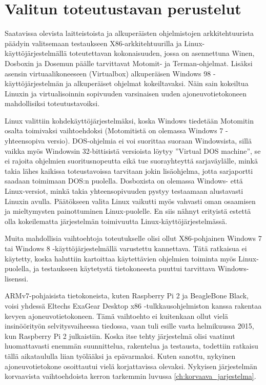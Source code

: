 \section{Valitun toteutustavan perustelut}
Saatavissa olevista laitteistoista ja alkuperäisten ohjelmistojen arkkitehtuurista päädyin valitsemaan testaukseen X86-arkkitehtuurilla ja Linux-käyttöjärjestelmällä toteutettavan kokonaisuuden, jossa on asennettuna Winen, Dosboxin ja Dosemun päälle tarvittavat Motomit- ja Terman-ohjelmat. Lisäksi asensin virtuaalikoneeseen (Virtualbox) alkuperäisen Windows 98 -käyttöjärjestelmän ja alkuperäiset ohjelmat kokeiltavaksi. Näin sain kokeiltua Linuxin ja virtualisoinnin sopivuuden varsinaisen uuden ajoneuvotietokoneen mahdollisiksi toteutustavoiksi.

Linux valittiin kohdekäyttöjärjestelmäksi, koska Windows tiedetään Motomitin osalta toimivaksi vaihtoehdoksi (Motomitistä on olemassa Windows 7 -yhteensopiva versio). DOS-ohjelmia ei voi suorittaa suoraan Windowsista, sillä vaikka myös Windowsin 32-bittisistä versioista löytyy ''Virtual DOS machine'',  se ei rajoita ohjelmien suoritusnopeutta eikä tue suorayhteyttä sarjaväylälle, minkä takia lähes kaikissa toteustavoissa tarvitaan jokin lisäohjelma, jotta sarjaportti saadaan toimimaan DOS:n puolella. Dosboxista on olemassa Windows- että Linux-versiot, minkä takia yhteensopivuuden pystyy testaamaan alustavasti Linuxin avulla. Päätökseen valita Linux vaikutti myös vahvasti oman osaamisen ja mieltymysten painottuminen Linux-puolelle. En siis nähnyt erityistä estettä olla kokeilematta järjestelmän toimivuutta Linux-käyttöjärjestelmässä.

Muita mahdollisia vaihtoehtoja toteutukselle olisi ollut X86-pohjainen Windows 7 tai Windows 8 -käyttöjärjestelmällä varustettu kannettava. Tätä ratkaisua ei käytetty, koska haluttiin kartoittaa käytettävien ohjelmien toiminta myös Linux-puolella, ja testaukseen käytetystä tietokoneesta puuttui tarvittava Windows-lisenssi.

ARMv7-pohjaisista tietokoneista, kuten Raspberry Pi 2 ja BeagleBone Black, voisi yhdessä Eltechs ExaGear Desktop x86 -tulkkausohjelmiston kanssa rakentaa kevyen ajoneuvotietokoneen. Tämä vaihtoehto ei kuitenkaan ollut vielä insinöörityön selvitysvaiheessa tiedossa, vaan tuli esille vasta helmikuussa 2015, kun Raspberry Pi 2 julkaistiin. Koska itse tehty järjestelmä olisi vaatinut huomattavasti enemmän suunnittelua, rakentelua ja testausta, todettiin ratkaisu tällä aikataululla liian työlääksi ja epävarmaksi. Kuten sanottu, nykyinen ajoneuvotietokone osoittautui vielä korjattavissa olevaksi. Nykyisen järjestelmän korvaavista vaihtoehdoista kerron tarkemmin luvussa \ref{ch:korvaava_jarjestelma}.

